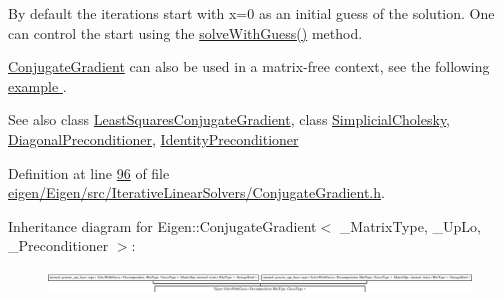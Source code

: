 By default the iterations start with x=0 as an initial guess of the solution. One can control the start using the \hyperlink{group___iterative_linear_solvers___module_adcc18d1ab283786dcbb5a3f63f4b4bd8}{solve\+With\+Guess()} method.

\hyperlink{group___iterative_linear_solvers___module_class_eigen_1_1_conjugate_gradient}{Conjugate\+Gradient} can also be used in a matrix-\/free context, see the following \hyperlink{group___matrixfree_solver_example}{example }.

\begin{DoxySeeAlso}{See also}
class \hyperlink{group___iterative_linear_solvers___module_class_eigen_1_1_least_squares_conjugate_gradient}{Least\+Squares\+Conjugate\+Gradient}, class \hyperlink{group___sparse_cholesky___module_class_eigen_1_1_simplicial_cholesky}{Simplicial\+Cholesky}, \hyperlink{group___iterative_linear_solvers___module_class_eigen_1_1_diagonal_preconditioner}{Diagonal\+Preconditioner}, \hyperlink{group___iterative_linear_solvers___module_class_eigen_1_1_identity_preconditioner}{Identity\+Preconditioner} 
\end{DoxySeeAlso}


Definition at line \hyperlink{eigen_2_eigen_2src_2_iterative_linear_solvers_2_conjugate_gradient_8h_source_l00096}{96} of file \hyperlink{eigen_2_eigen_2src_2_iterative_linear_solvers_2_conjugate_gradient_8h_source}{eigen/\+Eigen/src/\+Iterative\+Linear\+Solvers/\+Conjugate\+Gradient.\+h}.

Inheritance diagram for Eigen\+:\+:Conjugate\+Gradient$<$ \+\_\+\+Matrix\+Type, \+\_\+\+Up\+Lo, \+\_\+\+Preconditioner $>$\+:\begin{figure}[H]
\begin{center}
\leavevmode
\includegraphics[height=0.654206cm]{group___iterative_linear_solvers___module}
\end{center}
\end{figure}
